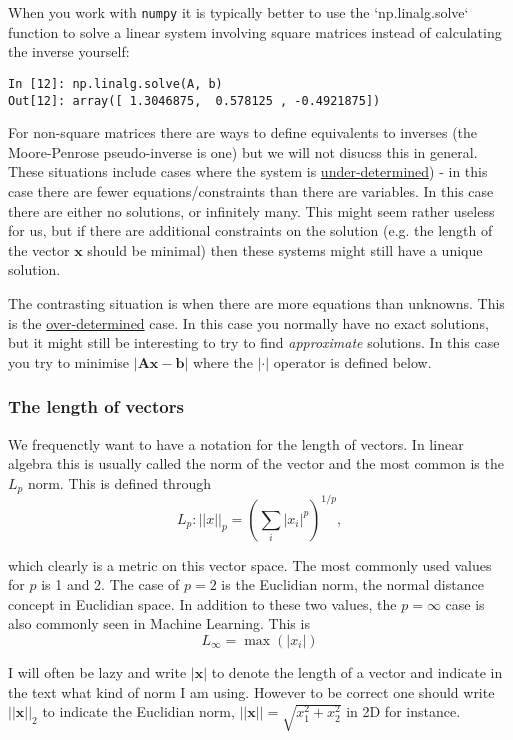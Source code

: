 \documentclass[a4paper,10pt]{article}
\newcommand{\link}[2]{{\color{blue}\href{#1}{#2}}}
\begin{document}
When you work with \texttt{numpy} it is typically better to use the `np.linalg.solve` function to solve a linear system involving square matrices instead of calculating the inverse yourself:
\begin{lstlisting}
In [12]: np.linalg.solve(A, b)
Out[12]: array([ 1.3046875,  0.578125 , -0.4921875])
\end{lstlisting}

For non-square matrices there are ways to define equivalents to inverses (the Moore-Penrose pseudo-inverse is one) but we will not disucss this in general. These situations include cases where the system is \link{https://en.wikipedia.org/wiki/Underdetermined_system}{under-determined}) - in this case there are fewer equations/constraints than there are variables. In this case there are either no solutions, or infinitely many. This might seem rather useless for us, but if there are additional constraints on the solution (e.g. the length of the vector $\mathbf{x}$ should be minimal) then these systems might still have a unique solution.

The contrasting situation is when there are more equations than unknowns. This is the \link{https://en.wikipedia.org/wiki/Overdetermined_system}{over-determined}
 case. In this case you normally have no exact solutions, but it might still be interesting to try to find \textit{approximate} solutions. In this case you try to minimise $|\mathbf{A}\mathbf{x} - \mathbf{b}|$ where the $|\cdot|$ operator is defined below.

\subsubsection{ The length of vectors}

We frequenctly want to have a notation for the length of vectors. In linear algebra this is usually called the norm of the vector and the most common is the $L_p$ norm. This is defined through
$$L_p : ||x||_p = \left(\sum_i \left|x_i \right|^p\right)^{1/p}, $$

which clearly is a metric on this vector space. The most commonly used values for $p$ is 1 and 2. The case of $p=2$ is the Euclidian norm, the normal distance concept in Euclidian space. In addition to these two values, the $p=\infty$ case is also commonly seen in Machine Learning. This is
$$L_\infty = \max \left(|x_i|\right)$$

I will often be lazy and write $|\mathbf{x}|$ to denote the length of a vector and indicate in the text what kind of norm I am using. However to be correct one should write $||\mathbf{x}||_2$ to indicate the Euclidian norm, $||\mathbf{x}|| = \sqrt{x_1^2 + x_2^2}$ in 2D for instance.
\end{document}
